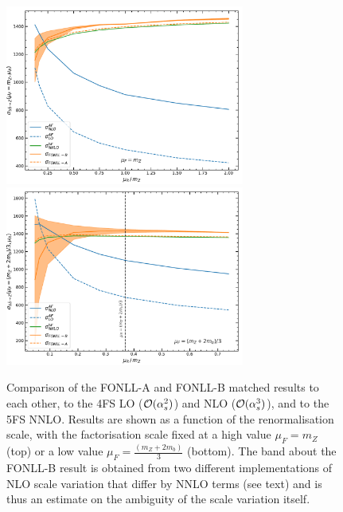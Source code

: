 \documentclass[12pt]{article}
\newcommand{\order}[1]{{\cal O}(#1)}
\begin{document}
\begin{figure}
  \begin{center}
    \includegraphics[width=0.7\textwidth]{muR_mh_var.pdf}
    \includegraphics[width=0.7\textwidth]{muR_var.pdf} 
    \caption{\label{fig:muR_var} Comparison of the FONLL-A and FONLL-B 
      matched results to each other, to the 4FS LO ($\order{\alpha_s^2}$)
      and NLO  ($\order{\alpha_s^3}$), and to the 5FS NNLO. Results are shown as a function of the
      renormalisation scale, with the factorisation scale fixed at a high value 
      $\mu_F=m_Z$  (top) or a low value  $\mu_F=\frac{(m_Z+2m_b)}{3}$
      (bottom). The band about the FONLL-B result is obtained from two
      different implementations of NLO scale variation that differ by NNLO
      terms (see text) and is thus an estimate on the ambiguity of the
      scale variation itself.
    }
  \end{center}
\end{figure}
%
\end{document}
